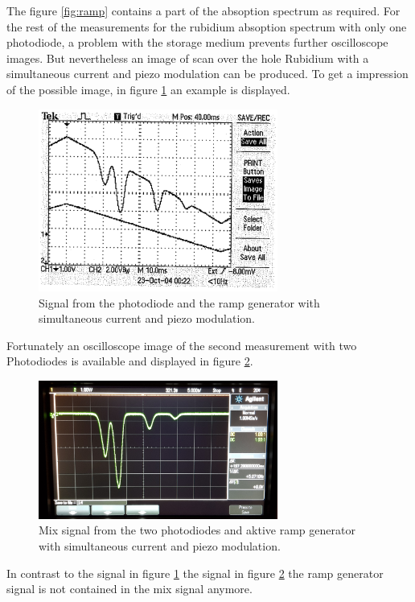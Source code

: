 The figure \ref{fig:ramp} contains a part of the
absoption spectrum as required.
For the rest of the measurements for the rubidium absoption spectrum
with only one photodiode, a problem with the storage medium
prevents further oscilloscope images.
But nevertheless an image of scan over the hole Rubidium
with a simultaneous current and piezo modulation
can be produced. To get a impression of the possible image,
in figure \ref{fig:theory_curve} an example is displayed.

\begin{figure}
  \centering
  \includegraphics[width = 0.7\textwidth]{Rb_modulation.png}
  \caption{Signal from the photodiode and the ramp generator with
  simultaneous current and piezo modulation. \cite{V60}}
  \label{fig:theory_curve}
\end{figure}

Fortunately an oscilloscope image of the second measurement
with two Photodiodes
is available and displayed in figure \ref{fig:2dioden}.

\begin{figure}
  \centering
  \includegraphics[width = 0.7\textwidth]{./figures/Rb_spectrum.jpg}
  \caption{Mix signal from the two photodiodes and aktive ramp generator with
  simultaneous current and piezo modulation.}
  \label{fig:2dioden}
\end{figure}

In contrast to the signal in figure \ref{fig:theory_curve}
the signal in figure \ref{fig:2dioden} the
ramp generator signal is not contained in the mix signal anymore.

